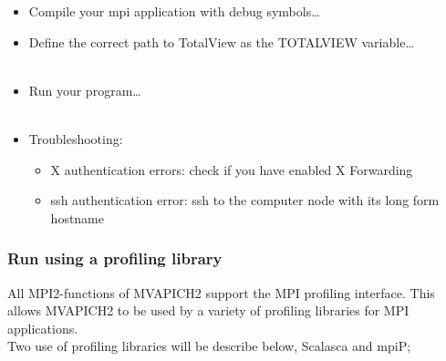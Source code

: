 \begin{itemize}
    \item Compile your mpi application with debug symbols\ldots\\
    \item Define the correct path to TotalView as the TOTALVIEW
        variable\ldots\\
        \\
    \item Run your program\ldots\\
        \\
    \item Troubleshooting:
        \begin{itemize}
            \item X authentication errors: check if you have enabled X Forwarding\\
            \item ssh authentication error: ssh to the computer node with its long form hostname\\
        \end{itemize}
\end{itemize}

\subsubsection{Run using a profiling library}
\label{subsec:mpi-prof}
All MPI2-functions of MVAPICH2
support the MPI profiling interface. This allows MVAPICH2
to be used by a variety of profiling libraries for MPI applications.\\

Two use of profiling libraries will be describe below, Scalasca and mpiP;

